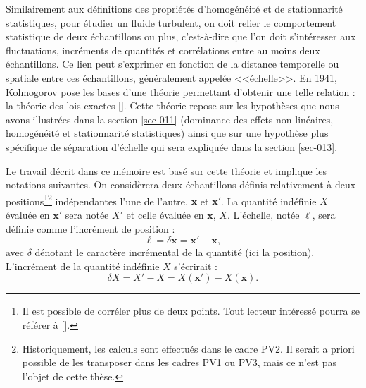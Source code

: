 Similairement aux définitions des propriétés d'homogénéité et de stationnarité statistiques, pour étudier un fluide turbulent, on doit relier le comportement statistique de deux échantillons ou plus, c'est-à-dire que l'on doit s'intéresser aux fluctuations, incréments de quantités et corrélations entre au moins deux échantillons. Ce lien peut s'exprimer en fonction de la distance temporelle ou spatiale entre ces échantillons, généralement appelée <<échelle>>. En 1941, Kolmogorov pose les bases d'une théorie permettant d'obtenir une telle relation : la théorie des lois exactes [\cite{frisch_turbulence_1995,kolmogorov_local_1991,kolmogorov_dissipation_1991}]. Cette théorie repose sur les hypothèses que nous avons illustrées dans la section \ref{sec-011} (dominance des effets non-linéaires, homogénéité et stationnarité statistiques) ainsi que sur une hypothèse plus spécifique de séparation d'échelle qui sera expliquée dans la section \ref{sec-013}.

Le travail décrit dans ce mémoire est basé sur cette théorie et implique les notations suivantes. On considèrera deux échantillons définis relativement à deux positions\footnote{Il est possible de corréler plus de deux points. Tout lecteur intéressé pourra se référer à [\cite{cho_simulations_2009}].}\footnote{Historiquement, les calculs sont effectués dans le cadre PV2. Il serait a priori possible de les transposer dans les cadres PV1 ou PV3, mais ce n'est pas l'objet de cette thèse.} indépendantes l'une de l'autre, $\mathbf{x}$ et $\mathbf{x'}$. La quantité indéfinie $X$ évaluée en $\mathbf{x'}$ sera notée $X'$ et celle évaluée en $\mathbf{x}$, $X$. L'échelle, notée $\boldsymbol{\ell}$, sera définie comme l'incrément de position : 
\begin{equation}
    \boldsymbol{\ell} = \delta \mathbf{x} = \mathbf{x'} - \mathbf{x} ,
\end{equation}
avec $\delta$ dénotant le caractère incrémental de la quantité (ici la position). L'incrément de la quantité indéfinie $X$ s'écrirait : 
\begin{equation}
    \delta X = X' - X = X(\mathbf{x'}) - X(\mathbf{x})  .
\end{equation}

